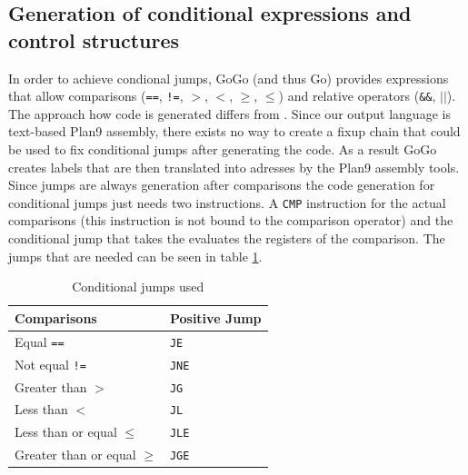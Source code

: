 \documentclass[a4paper]{scrartcl}
\let\section\subsection
\let\subsection\subsubsection
\let\subsubsection\paragraph
\let\paragraph\subparagraph
\let\subparagraph\undefined
\begin{document}
    \section{Generation of conditional expressions and control structures}
      In order to achieve condional jumps, GoGo (and thus Go) provides expressions 
      that allow comparisons (\texttt{==}, \texttt{!=}, \texttt{$>$}, \texttt{$<$},
      \texttt{$\ge$}, \texttt{$\le$}) and relative operators (\texttt{\&\&},
      \texttt{$||$}). The approach how code is generated differs from \cite{wir96}.
      Since our output language is text-based Plan9 assembly, there exists no way
      to create a fixup chain that could be used to fix conditional jumps after
      generating the code. As a result GoGo creates labels that are then 
      translated into adresses by the Plan9 assembly tools. \\

      Since jumps are always generation after comparisons the code generation 
      for conditional jumps just needs two instructions. A \texttt{CMP} instruction
      for the actual comparisons (this instruction is not bound to the comparison
      operator) and the conditional jump that takes the evaluates the registers
      of the comparison. The jumps that are needed can be seen in table \ref{tbl:jumps}.

      \begin{table}[htb]
        \centering
        \begin{tabular}{ll}
        \toprule
        \textbf{Comparisons} & \textbf{Positive Jump} \\
        \midrule
        Equal \texttt{==} & \texttt{JE}\\
        Not equal \texttt{!=} & \texttt{JNE}\\
        Greater than \texttt{$>$} & \texttt{JG}\\
        Less than \texttt{$<$} & \texttt{JL}\\
        Less than or equal \texttt{$\le$} & \texttt{JLE}\\
        Greater than or equal \texttt{$\ge$} & \texttt{JGE}\\
        \bottomrule
        \end{tabular}
        \caption{Conditional jumps used}
        \label{tbl:jumps}
      \end{table}
\end{document}
